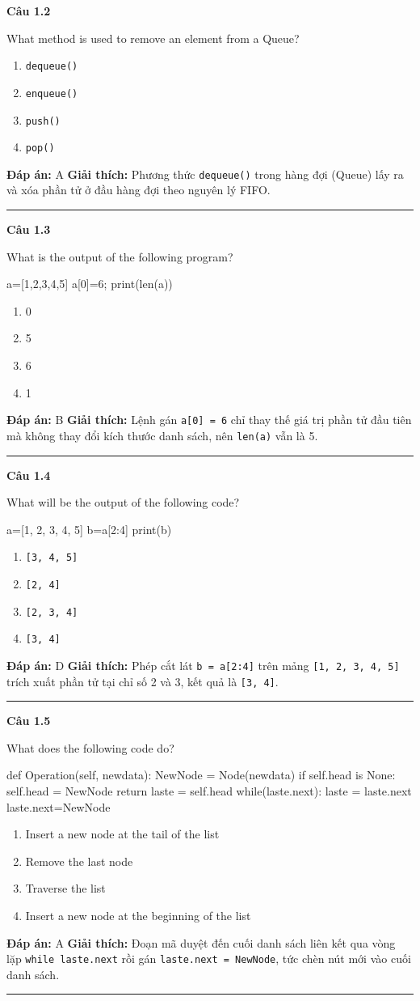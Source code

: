 \documentclass[11pt,a4paper]{article}
\newenvironment{question}[1]{%
  \par\vspace{1em}\noindent\textbf{\large Câu #1}\par\vspace{0.4em}
}{%
  \par\vspace{1em}\hrule\vspace{0.6em}
}
\newenvironment{choices}{%
  \begin{enumerate}[label=\textbf{\Alph*.},leftmargin=2.2em,itemsep=2pt,topsep=3pt]
}{%
  \end{enumerate}
}
\newcommand{\choice}{\item}
\newenvironment{codebox}{%
  \begin{tcolorbox}[colback=gray!8!white,colframe=gray!50!black,arc=1.5mm,boxrule=0.6pt,left=3mm,right=3mm,top=2.5mm,bottom=2.5mm]
  \ttfamily\small
}{%
  \end{tcolorbox}
}
\begin{document}
\begin{question}{1.2}
What method is used to remove an element from a Queue?
\begin{choices}
\choice \texttt{dequeue()}
\choice \texttt{enqueue()}
\choice \texttt{push()}
\choice \texttt{pop()}
\end{choices}
\textbf{Đáp án:} A
\textbf{Giải thích:} Phương thức \texttt{dequeue()} trong hàng đợi (Queue) lấy ra và xóa phần tử ở đầu hàng đợi theo nguyên lý FIFO.
\end{question}

\begin{question}{1.3}
What is the output of the following program?
\begin{codebox}
a=[1,2,3,4,5]
a[0]=6;
print(len(a))
\end{codebox}
\begin{choices}
\choice 0
\choice 5
\choice 6
\choice 1
\end{choices}
\textbf{Đáp án:} B
\textbf{Giải thích:} Lệnh gán \texttt{a[0] = 6} chỉ thay thế giá trị phần tử đầu tiên mà không thay đổi kích thước danh sách, nên \texttt{len(a)} vẫn là 5.
\end{question}

\begin{question}{1.4}
What will be the output of the following code?
\begin{codebox}
a=[1, 2, 3, 4, 5]
b=a[2:4]
print(b)
\end{codebox}
\begin{choices}
\choice \texttt{[3, 4, 5]}
\choice \texttt{[2, 4]}
\choice \texttt{[2, 3, 4]}
\choice \texttt{[3, 4]}
\end{choices}
\textbf{Đáp án:} D
\textbf{Giải thích:} Phép cắt lát \texttt{b = a[2:4]} trên mảng \texttt{[1, 2, 3, 4, 5]} trích xuất phần tử tại chỉ số 2 và 3, kết quả là \texttt{[3, 4]}.
\end{question}

\begin{question}{1.5}
What does the following code do?
\begin{codebox}
def Operation(self, newdata):
    NewNode = Node(newdata)
    if self.head is None:
        self.head = NewNode
        return
    laste = self.head
    while(laste.next):
        laste = laste.next
    laste.next=NewNode
\end{codebox}
\begin{choices}
\choice Insert a new node at the tail of the list
\choice Remove the last node
\choice Traverse the list
\choice Insert a new node at the beginning of the list
\end{choices}
\textbf{Đáp án:} A
\textbf{Giải thích:} Đoạn mã duyệt đến cuối danh sách liên kết qua vòng lặp \texttt{while laste.next} rồi gán \texttt{laste.next = NewNode}, tức chèn nút mới vào cuối danh sách.
\end{question}
\end{document}
